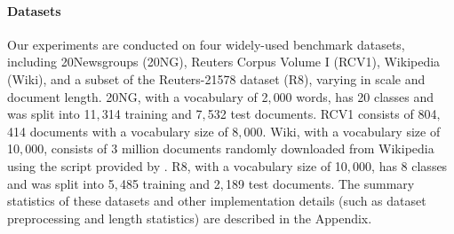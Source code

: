 \documentclass{article}
\begin{document}
 \paragraph{Datasets} Our experiments are conducted on four widely-used benchmark datasets, including 20Newsgroups ({20NG}), Reuters Corpus Volume I ({RCV1}), Wikipedia ({Wiki}), and a subset of the Reuters-21578 dataset ({R8}), varying in scale and document length. 20NG, with a vocabulary of 2$,$000 words, has 20 classes and was split into 11$,$314 training and 7$,$532 test documents. RCV1 consists of 804$,$414 documents with a vocabulary size of 8$,$000. Wiki, with a vocabulary size of 10$,$000, consists of 3 million documents randomly downloaded from Wikipedia using the script provided by \citet{hoffman2010online}. R8, with a vocabulary size of 10$,$000, has 8 classes and was split into 5$,$485 training and 2$,$189 test documents. The summary statistics of these datasets and other implementation details (such as dataset preprocessing and length statistics) are described in the Appendix. 
\end{document}
